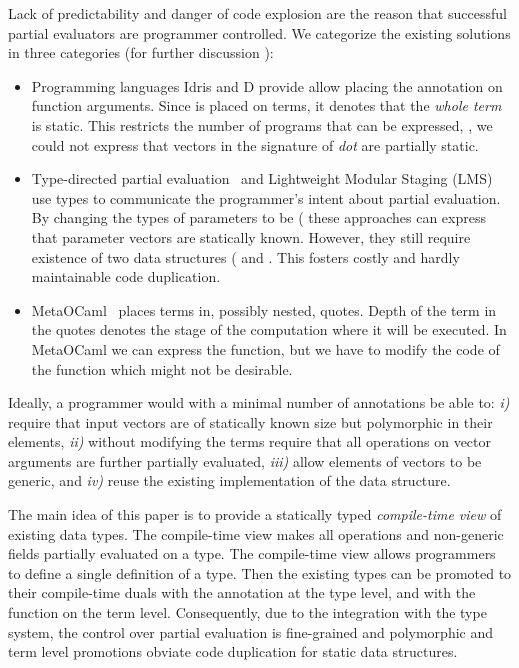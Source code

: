 Lack of predictability and danger of code explosion are the reason that
 successful partial evaluators
 \cite{brady2010,taha_multi-stage_1997,rompf2012lightweight,wurthinger2013one,le2004specialization}
  are programmer controlled. We categorize the existing solutions in three categories
 (for further discussion \cf {}):

\begin{itemize}
 \item Programming languages Idris and D provide allow placing the 
  annotation on function arguments. Since  is placed on terms, it
  denotes that the \emph{whole term} is static. This restricts the number of programs
  that can be expressed, \eg, we could not express that vectors in the signature of \emph{dot}
  are partially static.

 \item Type-directed partial evaluation~\cite{danvy1999type} and
  Lightweight Modular Staging (LMS)~\cite{rompf2012lightweight} use types to communicate
  the programmer's intent about partial evaluation. By changing the types of parameters
  to be (\eg {} these approaches can express that parameter vectors
  are statically known. However, they still require existence of two data structures
  (\eg {} and . This fosters costly and hardly maintainable
  code duplication.

 \item MetaOCaml~\cite{taha_multi-stage_1997} places terms in, possibly nested,
   quotes. Depth of the term in the quotes denotes the stage of the computation
   where it will be executed. In MetaOCaml we can express the  function,
   but we have to modify the code of the  function which might not be desirable.

\end{itemize}



Ideally, a programmer would with a minimal number of annotations be able to:
 \emph{i)} require that input vectors are of statically known size but polymorphic
  in their elements, \emph{ii)} without modifying the terms require that all operations
  on vector arguments are further partially evaluated, \emph{iii)} allow elements
  of vectors to be generic, and \emph{iv)} reuse the existing implementation of
  the  data structure.

The main idea of this paper is to provide a statically typed \emph{compile-time
 view} of existing data types. The compile-time view makes all operations and
 non-generic fields partially evaluated on a type. The compile-time view allows
 programmers to define a single definition of a type. Then the existing types
 can be promoted to their compile-time duals with the  annotation at
 the type level, and with the  function on the term level.
 Consequently, due to the integration with the type system, the control over
 partial evaluation is fine-grained and polymorphic and term level promotions
 obviate code duplication for static data structures.

